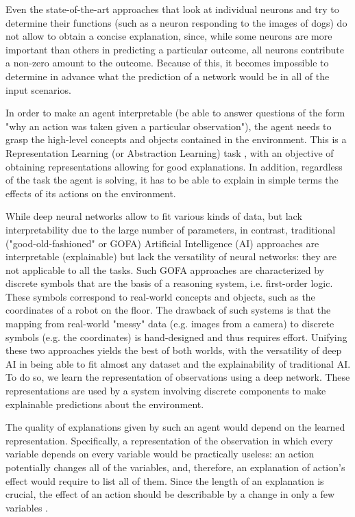 \documentclass[a4paper,11pt,oneside]{report}
\begin{document}
Even the state-of-the-art approaches that look at individual neurons and try to determine their functions (such as a neuron responding to the images of dogs) do not allow to obtain a concise explanation, since, while some neurons are more important than others in predicting a particular outcome, all neurons contribute a non-zero amount to the outcome. Because of this, it becomes impossible to determine in advance what the prediction of a network would be in all of the input scenarios.

In order to make an agent interpretable (be able to answer questions of the form "why an action was taken given a particular observation"), the agent needs to grasp the high-level concepts and objects contained in the environment. This is a Representation Learning (or Abstraction Learning) task \cite{Bengio2007,Learning2014,Deng,Mitchell2020,Scholkopf2021}, with an objective of obtaining representations allowing for good explanations. In addition, regardless of the task the agent is solving, it has to be able to explain in simple terms the effects of its actions on the environment.

While deep neural networks allow to fit various kinds of data, but lack interpretability due to the large number of parameters, in contrast, traditional ("good-old-fashioned" or GOFA) Artificial Intelligence (AI) approaches are interpretable (explainable) but lack the versatility of neural networks: they are not applicable to all the tasks.
Such GOFA approaches are characterized by discrete symbols that are the basis of a reasoning system, i.e. first-order logic.
These symbols correspond to real-world concepts and objects, such as the coordinates of a robot on the floor.
The drawback of such systems is that the mapping from real-world "messy" data (e.g. images from a camera) to discrete symbols (e.g. the coordinates) is hand-designed and thus requires effort.
Unifying these two approaches yields the best of both worlds, with the versatility of deep AI in being able to fit almost any dataset and the explainability of traditional AI.
To do so, we learn the representation of observations using a deep network. These representations are used by a system involving discrete components to make explainable predictions about the environment.

The quality of explanations given by such an agent would depend on the learned representation. Specifically, a representation of the observation in which every variable depends on every variable would be practically useless: an action potentially changes all of the variables, and, therefore, an explanation of action's effect would require to list all of them. Since the length of an explanation is crucial, the effect of an action should be describable by a change in only a few variables \cite{Schmidhuber2009,Chari2020,Gomez2006}.
\end{document}

